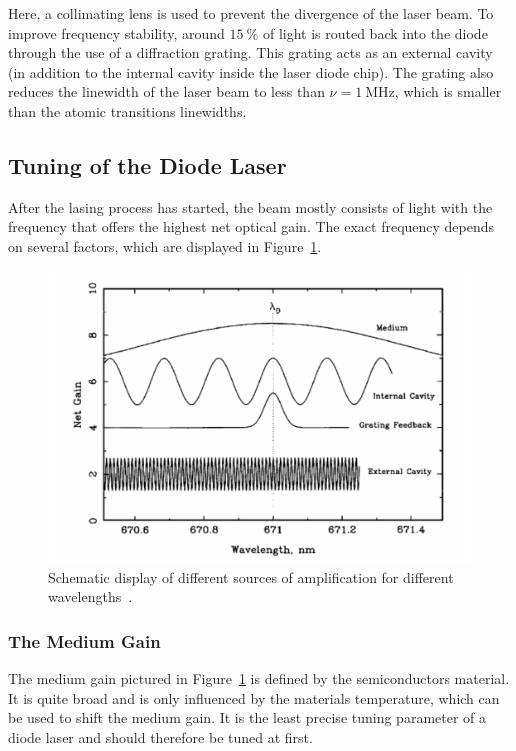 \noindent
Here, a collimating lens is used to prevent the divergence of the laser beam. To improve frequency stability,
around $\SI{15}{\percent}$ of light is routed back into the diode through the use of a diffraction grating.
This grating acts as an external cavity (in addition to the internal cavity inside the laser diode chip).
The grating also reduces the linewidth of the laser beam to less than $\nu = \SI{1}{\mega\hertz}$, which is
smaller than the atomic transitions linewidths.

\subsection{Tuning of the Diode Laser}
\label{sec:tuning}
After the lasing process has started, the beam mostly consists of light with the frequency that offers the highest
net optical gain. The exact frequency depends on several factors, which are displayed in
Figure~\ref{fig:diode-frequency}.
\begin{figure}
  \centering
  \includegraphics[scale=0.4]{./pictures/Diode-frequency.png}
  \caption{Schematic display of different sources of amplification for different wavelengths~\cite{teachspin}.}
  \label{fig:diode-frequency}
\end{figure}
\subsubsection{The Medium Gain}
\label{sec:mediumgain}
The medium gain pictured in Figure~\ref{fig:diode-frequency} is defined by the semiconductors material. It is
quite broad and is only influenced by the materials temperature, which can be used to shift the medium gain.
It is the least precise tuning parameter of a diode laser and should therefore be tuned at first.
